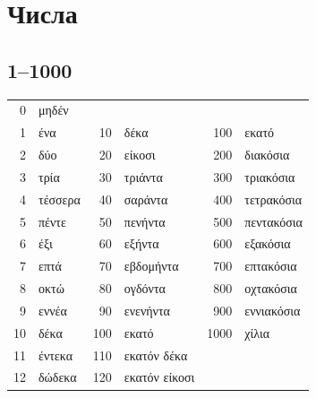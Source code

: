 \documentclass[12pt]{article}
\newcommand{\my}[1]{\textcolor{gray!80!white}{#1}}
\newenvironment{page}{\clearpage\normalsize\null\vfill}{\vfill\null}
\begin{document}
    \sloppy
	\pagestyle{empty}
    \setlength{\tabcolsep}{3pt}
    \setlength{\parindent}{0pt}

%
%

    \clearpage
    \footnotesize
	\tableofcontents
	\centering

	\begin{page}
        \section{Числа}
        \subsection{1--1000}
		\small
		\begin{tabular}{rlrlrl}
			\my{0} & μηδέν\\
			\my{1} & ένα & \my{10} & δέκα & \my{100} & εκατό\\
			\my{2} & δύο & \my{20} & είκοσι & \my{200} & διακόσια\\
			\my{3} & τρία & \my{30} & τριάντα & \my{300} & τριακόσια\\
			\my{4} & τέσσερα & \my{40} & σαράντα & \my{400} & τετρακόσια\\
			\my{5} & πέντε & \my{50} & πενήντα & \my{500} & πεντακόσια\\
			\my{6} & έξι & \my{60} & εξήντα & \my{600} & εξακόσια\\
			\my{7} & επτά & \my{70} & εβδομήντα & \my{700} & επτακόσια\\
			\my{8} & οκτώ & \my{80} & ογδόντα & \my{800} & οχτακόσια\\
			\my{9} & εννέα & \my{90} & ενενήντα & \my{900} & εννιακόσια\\
			\my{10} & δέκα & \my{100} & εκατό &\my{1000} & χίλια\\
			\my{11} & έντεκα & \my{110} & εκατόν δέκα\\
			\my{12} & δώδεκα & \my{120} & εκατόν είκοσι\\
		\end{tabular}
		\vfill

\end{page}
\end{document}

